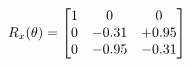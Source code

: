 \documentclass[preview]{standalone}
\begin{document}
\begin{align*}
\special{dvisvgm:raw <g id='unique000'>}R_{x}(\theta) = \begin{bmatrix}1 & 0 & 0 \\0 & -0.31 & +0.95 \\0 & -0.95 & -0.31\end{bmatrix}\special{dvisvgm:raw </g>}
\end{align*}
\end{document}

